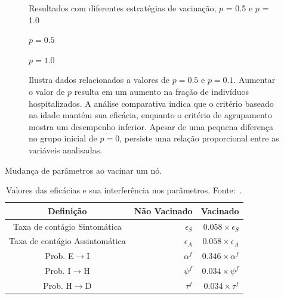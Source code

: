 \begin{figure}[H]
    \centering


      \captionsetup{font=normalsize,skip=0.8pt,singlelinecheck=on,labelsep=endash}
        \caption{Resultados com diferentes estratégias de vacinação, $p$ = 0.5 e $p$ = 1.0}

    \begin{minipage}[b]{0.495\textwidth}
      \centering
      \caption*{$p = 0.5$}
    \end{minipage}
    \hfill
    \begin{minipage}[b]{0.495\textwidth}
      \centering
      \caption*{$p = 1.0$}
    \end{minipage}
    \captionsetup{font=small,justification=justified}

    \caption*{Ilustra dados relacionados a valores de $p = 0.5$ e $p = 0.1$.
    Aumentar o valor de $p$ resulta em um aumento na fração de indivíduos hospitalizados. A análise comparativa indica que o critério baseado na idade mantém sua eficácia, enquanto o critério de agrupamento mostra um desempenho inferior. Apesar de uma pequena diferença no grupo inicial de $p = 0$, persiste uma relação proporcional entre as variáveis analisadas.}
    \label{fig:hospitalizados_vacinado_p}
\end{figure}


\begin{table}[H]
    \captionsetup{width=13.5cm}
    \caption{Mudança de parâmetros ao vacinar um nó.}
    \centering
    \begin{tabular}{crr}
        \toprule
        Definição & Não Vacinado & Vacinado  \\
        \midrule
        \midrule
        Taxa de contágio Sintomática & \(\epsilon_S\) & \(0.058 \times \epsilon_S\)\\
        Taxa de contágio Assintomática & \(\epsilon_A\) & \(0.058 \times \epsilon_A\)\\
        Prob. E\(\rightarrow\)I & \(\alpha^f\) & \(0.346 \times \alpha^f\)\\
        Prob. I\(\rightarrow\)H & \(\psi^f\) & \(0.034 \times \psi^f\) \\
        Prob. H\(\rightarrow\)D & \(\tau^f\) & \(0.034 \times \tau^f\)\\
        \bottomrule
    \end{tabular}
    \caption*{Valores das eficácias e sua interferência nos parâmetros. Fonte:~\cite{Haas2021}.}
    \label{tabela:vacina_adaptada}
\end{table}
